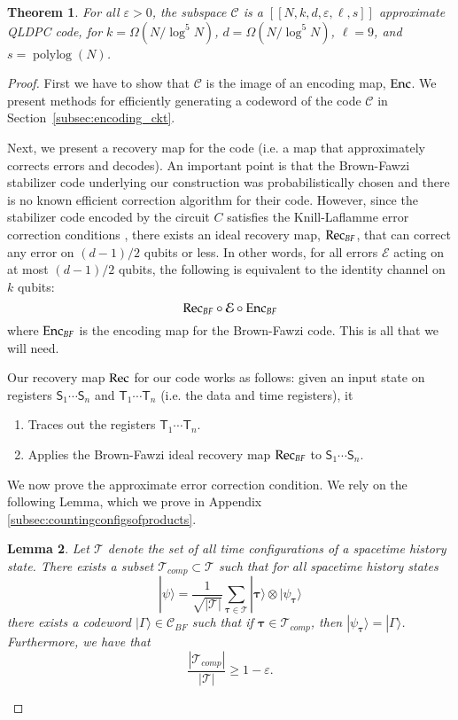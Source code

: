 \documentclass[11pt,letterpaper]{article}
\newtheorem{theorem}{Theorem}[section]
\newtheorem{lemma}[theorem]{Lemma}
\theoremstyle{definition}
\theoremstyle{remark}
\DeclareMathOperator{\polylog}{polylog}
\newcommand{\cC}{\mathcal C}
\newcommand{\cE}{\mathcal E}
\newcommand{\cT}{\mathcal T}
\renewcommand{\geq}{\geqslant}
\let\epsilon=\varepsilon
\numberwithin{equation}{section}
\newcommand{\eps}{\epsilon}
\theoremstyle{definition}
\newcommand{\ket}[1]{|#1\rangle}
\newcommand{\sS}{{\mathsf{S}}}
\newcommand{\sT}{{\mathsf{T}}}
\newcommand{\timeconfig}{{\bm{\tau}}}
\begin{document}
\begin{theorem}
  For all $\eps > 0$, the subspace $\cC$ is a $[[N,k,d,\eps,\ell,s]]$ approximate QLDPC code, for $k = \Omega(N/\log^5 N)$, $d = \Omega(N/\log^5 N)$, $\ell = 9$, and $s = \polylog(N)$.
\end{theorem}
\begin{proof}
First we have to show that $\cC$ is the image of an encoding map, $\mathrm{Enc}$. We present methods for efficiently generating a codeword of the code $\cC$ in Section~\ref{subsec:encoding_ckt}. 

Next, we present a recovery map for the code (i.e. a map that approximately corrects errors and decodes). An important point is that the Brown-Fawzi stabilizer code underlying our construction was probabilistically chosen and there is no known efficient correction algorithm for their code. However, since the stabilizer code encoded by the circuit $C$ satisfies the Knill-Laflamme error correction conditions \cite{quant-ph/9604034}, there exists an ideal recovery map, $\mathrm{Rec}_{BF}$, that can correct any error on $(d-1)/2$ qubits or less. In other words, for all errors $\cE$ acting on at most $(d-1)/2$ qubits, the following is equivalent to the identity channel on $k$ qubits:
\begin{equation}
  \Rec_{BF} \circ \cE \circ \Enc_{BF}
\end{equation}
where $\mathrm{Enc}_{BF}$ is the encoding map for the Brown-Fawzi code. This is all that we will need. %

Our recovery map $\mathrm{Rec}$ for our code works as follows: given an input state on registers $\sS_1 \cdots \sS_n$ and $\sT_1 \cdots \sT_n$ (i.e. the data and time registers), it
\begin{enumerate}
  \item Traces out the registers $\sT_1 \cdots \sT_n$.
  \item Applies the Brown-Fawzi ideal recovery map $\mathrm{Rec}_{BF}$ to $\sS_1 \cdots \sS_n$.
\end{enumerate}

We now prove the approximate error correction condition. We rely on the following Lemma, which we prove in Appendix \ref{subsec:countingconfigsofproducts}.

\begin{lemma}
\label{lem:overlap}
  Let $\cT$ denote the set of all time configurations of a spacetime history state. There exists a subset $\cT_{comp} \subset \cT$ such that for all spacetime history states
  \begin{equation}
    \ket{\psi} = \frac{1}{\sqrt{|\cT|}} \sum_{\timeconfig \in \cT} \ket{\timeconfig} \otimes \ket{\psi_\timeconfig}
  \end{equation}
  there exists a codeword $\ket{\Gamma} \in \cC_{BF}$ such that if $\timeconfig \in \cT_{comp}$, then $\ket{\psi_\timeconfig} = \ket{\Gamma}$. Furthermore, we have that{}
  \begin{equation}
    \frac{|\cT_{comp}|}{|\cT|} \geq 1 - \eps.
  \end{equation}
%
%
%
%
%
\end{lemma}


\end{proof}
\end{document}
